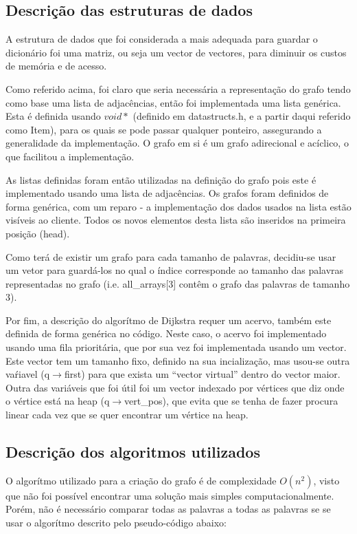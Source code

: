 \documentclass[a4paper, 11pt]{article}
\begin{document}
\subsection{Descrição das estruturas de dados}
    \par A estrutura de dados que foi considerada a mais adequada para guardar o dicionário foi uma matriz, ou seja um vector de vectores, para diminuir os custos de memória e de acesso.
    \par Como referido acima, foi claro que seria necessária a representação do grafo tendo como base uma lista de adjacências, então foi implementada uma lista genérica. Esta é definida usando $void *$ (definido em datastructs.h, e a partir daqui referido como Item), para os quais se pode passar qualquer ponteiro, assegurando a generalidade da implementação. O grafo em si é um grafo adirecional e acíclico, o que facilitou a implementação.
    \par As listas definidas foram então utilizadas na definição do grafo pois este é implementado usando uma lista de adjacências. Os grafos foram definidos de forma genérica, com um reparo - a implementação dos dados usados na lista estão visíveis ao cliente. Todos os novos elementos desta lista são inseridos na primeira posição (head).
    \par Como terá de existir um grafo para cada tamanho de palavras, decidiu-se usar um vetor para guardá-los no qual o índice corresponde ao tamanho das palavras representadas no grafo (i.e. all{\_}arrays[3] contêm o grafo das palavras de tamanho 3).
    \par Por fim, a descrição do algorítmo de Dijkstra requer um acervo, também este definida de forma genérica no código. Neste caso, o acervo foi implementado usando uma fila prioritária, que por sua vez foi implementada usando um vector. Este vector tem um tamanho fixo, definido na sua incialização, mas usou-se outra vaŕiavel (q$\rightarrow$first) para que exista um ``vector virtual''  dentro do vector maior. Outra das variáveis que foi útil foi um vector indexado por vértices que diz onde o vértice está na heap (q$\rightarrow$vert{\_}pos), que evita que se tenha de fazer procura linear cada vez que se quer encontrar um vértice na heap.
    
\subsection{Descrição dos algoritmos utilizados}
    \par O algorítmo utilizado para a criação do grafo é de complexidade $O(n^2)$, visto que não foi possível encontrar uma solução mais simples computacionalmente. Porém, não é necessário comparar todas as palavras a todas as palavras se se usar o algorítmo descrito pelo pseudo-código abaixo:
    
\end{document}

